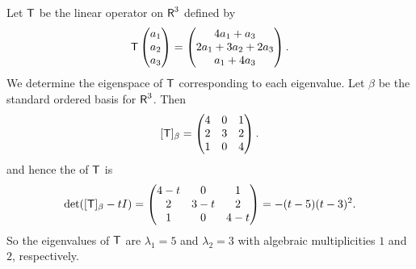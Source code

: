 \begin{example} \label{example 5.2.4}
Let \(\textsf{T}\) be the linear operator on \(\textsf{R}^3\) defined by
\[
    \textsf{T} \begin{pmatrix} a_1 \\ a_2 \\ a_3 \end{pmatrix} = \begin{pmatrix} 4 a_1 + a_3 \\ 2 a_1 + 3 a_2 + 2 a_3 \\ a_1 + 4 a_3 \end{pmatrix}.
\]
We determine the eigenspace of \(\textsf{T}\) corresponding to each eigenvalue.
Let \(\beta\) be the standard ordered basis for \(\textsf{R}^3\).
Then
\[
    [\textsf{T}]_{\beta} = \begin{pmatrix} 4 & 0 & 1 \\ 2 & 3 & 2 \\ 1 & 0 & 4 \end{pmatrix}.
\]
and hence the \CPOLY{} of \(\textsf{T}\) is
\[
    \det([\textsf{T}]_{\beta} - tI) = \begin{pmatrix} 4 - t & 0 & 1 \\ 2 & 3 - t & 2 \\ 1 & 0 & 4 - t \end{pmatrix} = -(t - 5)(t - 3)^2.
\]
So the eigenvalues of \(\textsf{T}\) are \(\lambda_1 = 5\) and \(\lambda_2 = 3\) with algebraic multiplicities \(1\) and \(2\), respectively.


\end{example}
